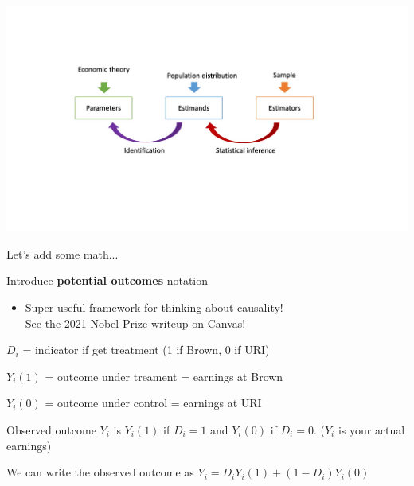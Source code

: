 \documentclass[11pt,english,handout]{beamer}
\newenvironment{wideitemize}{\itemize\addtolength{\itemsep}{10pt}}{\enditemize}
\begin{document}
\begin{frame}
	\includegraphics[width=1.2\textwidth]{BigPicture}
\end{frame}


\begin{frame}{Let's add some math...}
\begin{wideitemize}
	\item Introduce \textbf{potential outcomes} notation
		\begin{itemize}
			\item 
			Super useful framework for thinking about causality! \\
			See the 2021 Nobel Prize writeup on Canvas!
		\end{itemize}
	
	\pause 
	\item $D_i$ = indicator if get treatment (1 if Brown, 0 if URI)
	
	\pause
	\item $Y_i(1)$ = outcome under treament = earnings at Brown
	\item $Y_i(0)$ = outcome under control = earnings at URI
	
	\pause 
	\item Observed outcome $Y_i$ is $Y_i(1)$ if $D_i = 1$ and $Y_i(0)$ if $D_i = 0$. ($Y_i$ is your actual earnings)
	
	\pause
	\item
	We can write the observed outcome as $Y_i = D_i Y_i(1) + (1-D_i) Y_i(0)$
\end{wideitemize}

\end{frame}
\end{document}
